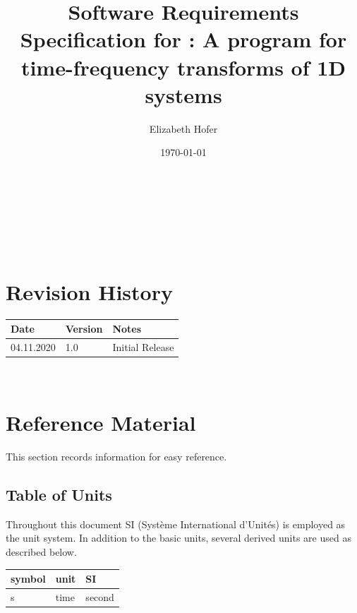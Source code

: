 \documentclass[12pt]{article}
\begin{document}
\title{Software Requirements Specification for \progname{}: A program for time-frequency transforms of 1D systems} 
\author{Elizabeth Hofer}
\date{\today}
	
\maketitle


\\
~\newpage


\tableofcontents

~\newpage

\section*{Revision History}

\begin{tabularx}{\textwidth}{p{3cm}p{2cm}X}
\toprule {\bf Date} & {\bf Version} & {\bf Notes}\\
\midrule
04.11.2020 & 1.0 & Initial Release\\
\bottomrule
\end{tabularx}

~\newpage

\section{Reference Material}

This section records information for easy reference.

\subsection{Table of Units}

Throughout this document SI (Syst\`{e}me International d'Unit\'{e}s) is employed
as the unit system.  In addition to the basic units, several derived units are
used as described below.

\renewcommand{\arraystretch}{1.2}
\begin{table}[ht]
  \noindent \begin{tabular}{l l l} 
    \toprule		
    \textbf{symbol} & \textbf{unit} & \textbf{SI}\\
    \midrule 
    \si{\second} & time & second\\
    \bottomrule
  \end{tabular}
\end{table}
\end{document}
